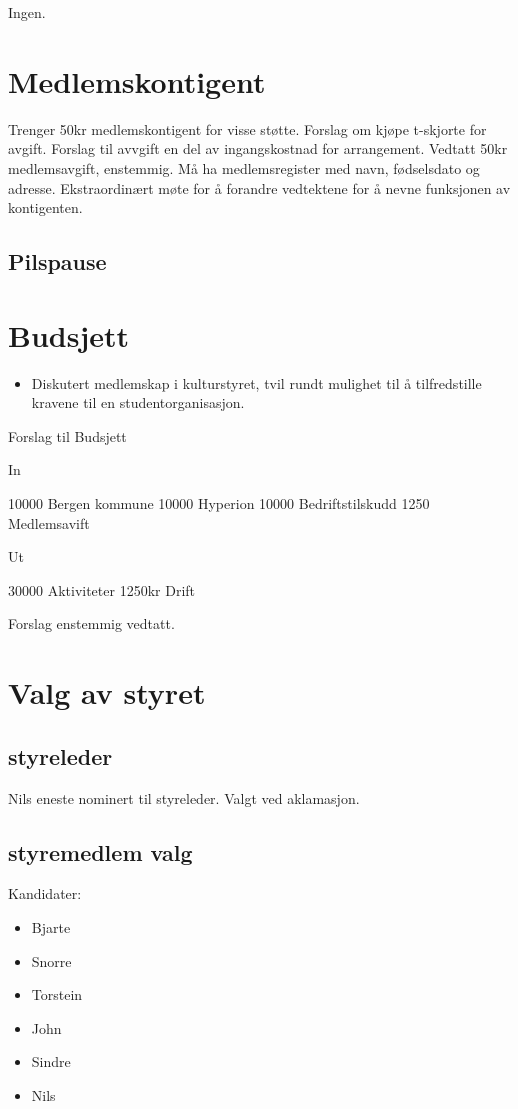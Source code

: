 \documentclass{article}
\begin{document}
Ingen.

\section*{Medlemskontigent}

Trenger 50kr medlemskontigent for visse støtte. Forslag om kjøpe t-skjorte for
avgift. Forslag til avvgift en del av ingangskostnad for arrangement.  Vedtatt
50kr medlemsavgift, enstemmig.  Må ha medlemsregister med navn, fødselsdato og
adresse.  Ekstraordinært møte for å forandre vedtektene for å nevne funksjonen
av kontigenten.

\subsection*{Pilspause}

\section*{Budsjett}

\begin{itemize}
  \item Diskutert medlemskap i kulturstyret, tvil rundt mulighet til å tilfredstille
    kravene til en studentorganisasjon.
\end{itemize}

Forslag til Budsjett

In

10000 Bergen kommune
10000 Hyperion
10000 Bedriftstilskudd
1250   Medlemsavift

Ut

30000 Aktiviteter
1250kr Drift


Forslag enstemmig vedtatt.

\section*{Valg av styret}

\subsection*{styreleder}
Nils eneste nominert til styreleder. Valgt ved aklamasjon.

\subsection*{styremedlem valg}

Kandidater:
\begin{itemize}
  \item Bjarte
  \item Snorre
  \item Torstein
  \item John
  \item Sindre
  \item Nils
\end{itemize}
\end{document}
